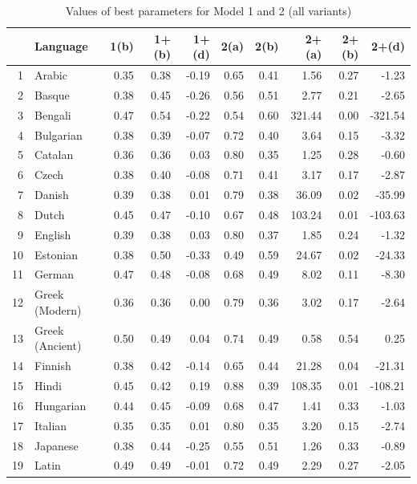 \documentclass[a4paper]{article}
\begin{document}
\begin{table}[hbtp]
\captionsetup{justification=raggedright}
\caption {Values of best parameters for Model 1 and 2 (all variants)}
\centering
\begin{tabular}{rlrrrrrrrr}
  \hline
 & Language & 1(b) & 1+(b) & 1+(d) & 2(a) & 2(b) & 2+(a) & 2+(b) & 2+(d) \\ 
  \hline
1 & Arabic & 0.35 & 0.38 & -0.19 & 0.65 & 0.41 & 1.56 & 0.27 & -1.23 \\ 
  2 & Basque & 0.38 & 0.45 & -0.26 & 0.56 & 0.51 & 2.77 & 0.21 & -2.65 \\ 
  3 & Bengali & 0.47 & 0.54 & -0.22 & 0.54 & 0.60 & 321.44 & 0.00 & -321.54 \\ 
  4 & Bulgarian & 0.38 & 0.39 & -0.07 & 0.72 & 0.40 & 3.64 & 0.15 & -3.32 \\ 
  5 & Catalan & 0.36 & 0.36 & 0.03 & 0.80 & 0.35 & 1.25 & 0.28 & -0.60 \\ 
  6 & Czech & 0.38 & 0.40 & -0.08 & 0.71 & 0.41 & 3.17 & 0.17 & -2.87 \\ 
  7 & Danish & 0.39 & 0.38 & 0.01 & 0.79 & 0.38 & 36.09 & 0.02 & -35.99 \\ 
  8 & Dutch & 0.45 & 0.47 & -0.10 & 0.67 & 0.48 & 103.24 & 0.01 & -103.63 \\ 
  9 & English & 0.39 & 0.38 & 0.03 & 0.80 & 0.37 & 1.85 & 0.24 & -1.32 \\ 
  10 & Estonian & 0.38 & 0.50 & -0.33 & 0.49 & 0.59 & 24.67 & 0.02 & -24.33 \\ 
  11 & German & 0.47 & 0.48 & -0.08 & 0.68 & 0.49 & 8.02 & 0.11 & -8.30 \\ 
  12 & Greek (Modern) & 0.36 & 0.36 & 0.00 & 0.79 & 0.36 & 3.02 & 0.17 & -2.64 \\ 
  13 & Greek (Ancient) & 0.50 & 0.49 & 0.04 & 0.74 & 0.49 & 0.58 & 0.54 & 0.25 \\ 
  14 & Finnish & 0.38 & 0.42 & -0.14 & 0.65 & 0.44 & 21.28 & 0.04 & -21.31 \\ 
  15 & Hindi & 0.45 & 0.42 & 0.19 & 0.88 & 0.39 & 108.35 & 0.01 & -108.21 \\ 
  16 & Hungarian & 0.44 & 0.45 & -0.09 & 0.68 & 0.47 & 1.41 & 0.33 & -1.03 \\ 
  17 & Italian & 0.35 & 0.35 & 0.01 & 0.80 & 0.35 & 3.20 & 0.15 & -2.74 \\ 
  18 & Japanese & 0.38 & 0.44 & -0.25 & 0.55 & 0.51 & 1.26 & 0.33 & -0.89 \\ 
  19 & Latin & 0.49 & 0.49 & -0.01 & 0.72 & 0.49 & 2.29 & 0.27 & -2.05 \\ 

\end{tabular}
\end{table}
\end{document}
